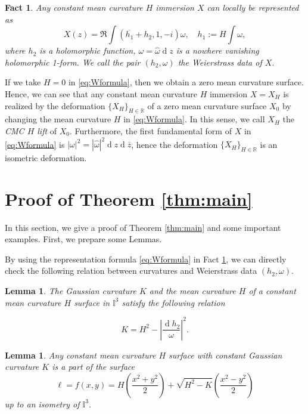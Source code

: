 \documentclass[12pt,a4paper,reqno]{amsart}
\theoremstyle{plain} %
\newtheorem{lemma}[theorem]{Lemma}
\newtheorem{fact}[theorem]{Fact}
\theoremstyle{definition}
\begin{document}
\begin{fact}\label{fact:Wformula}
Any constant mean curvature $H$ immersion $X$ can locally be represented as 
	\begin{equation}\label{eq:Wformula}
	X(z)= \Re \int \left(\overline{h_1}+h_2, 1, -i\right)\omega, \quad h_1:=H\int \omega,
	\end{equation}
where $h_2$ is a holomorphic function, $\omega=\hat{\omega}\operatorname{d}\!z$ is a nowhere vanishing holomorphic 1-form. We call the pair $(h_2,\omega)$ the {\it Weierstrass data} of $X$.
\end{fact}

If we take $H=0$ in \eqref{eq:Wformula}, then we obtain a zero mean curvature surface. Hence, we can see that any constant mean curvature $H$ immersion $X=X_H$ is realized by the deformation $\{X_H\}_{H\in \mathbb{R}}$ of a zero mean curvature surface $X_0$ by changing the mean curvature $H$ in \eqref{eq:Wformula}. In this sense, we call $X_H$ the {\it CMC $H$ lift} of $X_0$.
 Furthermore, the first fundamental form of $X$ in \eqref{eq:Wformula} is $|\omega|^2=|\hat{\omega}|^2\operatorname{d}\!z\operatorname{d}\!\bar{z}$, hence the deformation $\{X_H\}_{H\in \mathbb{R}}$ is an isometric deformation.


\section{Proof of Theorem \ref{thm:main}}\label{sec3}

In this section, we give a proof of Theorem \ref{thm:main} and some important examples.
First, we prepare some Lemmas.

By using the representation formula \eqref{eq:Wformula} in Fact \ref{fact:Wformula}, we can directly check the following  relation between curvatures and Weierstrass data $(h_2,\omega)$.

\begin{lemma}\label{lemma}
The Gaussian curvature $K$ and the mean curvature $H$ of a constant mean curvature $H$ surface in $\mathbb{I}^3$ satisfy the following relation

	\begin{equation}\label{eq:KH}
	K=H^2-\left| \frac{\operatorname{d}\!h_2}{\omega} \right|^2.
	\end{equation}
\end{lemma}

\begin{lemma}\label{lemma2}
Any constant mean curvature $H$ surface with constant Gaussian curvature $K$ is a part of the surface
	\begin{equation}\label{eq:EHP}
	\ell = f(x,y)=H\left( \frac{x^2+y^2}{2}\right)+ \sqrt{H^2-K}\left( \frac{x^2-y^2}{2}\right)
	\end{equation}
up to an isometry of $\mathbb{I}^3$.
\end{lemma}
\end{document}
